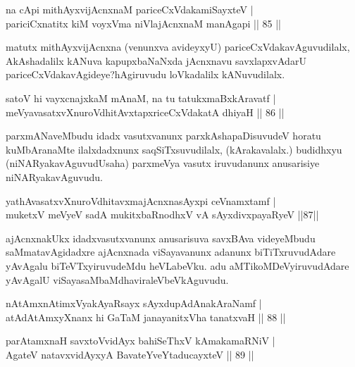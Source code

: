 \begin{shl}
na cApi mithAyxvijAcnxnaM pariceCxVdakamiSayxteV |\\
pariciCxnatitx kiM voyxVma niVlajAcnxnaM manAgapi \hfill || 85 ||
\end{shl}

\begin{artha}
matutx mithAyxvijAcnxna (venunxva avideyxyU) pariceCxVdakavAguvudilalx, AkAshadalilx 
kANuva kapupxbaNaNxda jAcnxnavu savxlapxvAdarU pariceCxVdakavAgideye?\break hAgiruvudu loVkadalilx 
kANuvudilalx.
\end{artha}

\begin{shl}
satoV hi vayxcnajxkaM mAnaM, na tu tatukxmaBxkAravatf |\\
meVyavasatxvXnuroVdhitAvxtapxriceCxVdakatA dhiyaH \hfill || 86 ||
\end{shl}

\begin{artha}
parxmANaveMbudu idadx vasutxvanunx parxkAshapaDisuvudeV horatu kuMbAranaMte ilalxdadxnunx 
saqSiTxsuvudilalx, (kArakavalalx.) budidhxyu (niNARyakavAguvudUsaha) parxmeVya vasutx 
iruvudanunx anusarisiye niNARyakavAguvudu.
\end{artha}

\begin{shl}
yathAvasatxvXnuroVdhitavxmajAcnxnasAyxpi ceVnamxtamf |\\
muketxV meVyeV sadA mukitxbaRnodhxV vA sAyxdivxpayaRyeV \hfill ||87||
\end{shl}

\begin{artha}
ajAcnxnakUkx idadxvasutxvanunx anusarisuva savxBAva videyeMbudu saMmatavAgidadxre ajAcnxnada viSayavanunx adanunx biTiTxruvudAdare yAvAgalu biTeVTxyiruvudeMdu heVLabeVku. adu aMTikoMDeVyiruvudAdare yAvAgalU viSayasaMbaMdhaviraleVbeVkAguvudu.
\end{artha}


\begin{shl}
nA\s \s tAmx\s nAtimxVyakAyaRsayx sAyxdupAdAnakAraNamf |\\
atAdAtAmxyXnanx hi GaTaM janayanitxVha tanatxvaH \hfill || 88 ||
\end{shl}

\begin{shl}
parAtamxnaH savxtoV\s vidAyx bahiSeThxV kAmakamaRNiV |\\
AgateV natavxvidAyxyA BavateYveYtaducayxteV \hfill || 89 ||
\end{shl}

